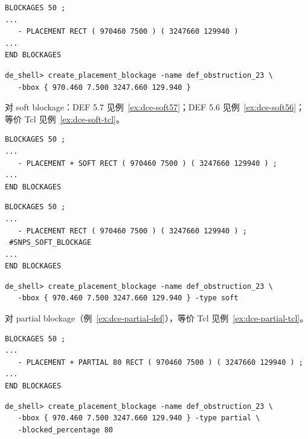 \begin{lstlisting}[caption={DEF hard placement blockage},label={ex:dce-hard-blk-def}]
BLOCKAGES 50 ;
...
   - PLACEMENT RECT ( 970460 7500 ) ( 3247660 129940 )
...
END BLOCKAGES
\end{lstlisting}

\begin{lstlisting}[caption={等价 Tcl},label={ex:dce-hard-blk-tcl}]
de_shell> create_placement_blockage -name def_obstruction_23 \
   -bbox { 970.460 7.500 3247.660 129.940 }
\end{lstlisting}

对 soft blockage：DEF 5.7 见例~\ref{ex:dce-soft57}；DEF 5.6 见例~\ref{ex:dce-soft56}；等价 Tcl 见例~\ref{ex:dce-soft-tcl}。

\begin{lstlisting}[caption={DEF 5.7 soft placement blockage},label={ex:dce-soft57}]
BLOCKAGES 50 ;
...
   - PLACEMENT + SOFT RECT ( 970460 7500 ) ( 3247660 129940 ) ;
...
END BLOCKAGES
\end{lstlisting}

\begin{lstlisting}[caption={DEF 5.6 soft placement blockage},label={ex:dce-soft56}]
BLOCKAGES 50 ;
...
   - PLACEMENT RECT ( 970460 7500 ) ( 3247660 129940 ) ;
 #SNPS_SOFT_BLOCKAGE
...
END BLOCKAGES
\end{lstlisting}

\begin{lstlisting}[caption={soft blockage 等价 Tcl},label={ex:dce-soft-tcl}]
de_shell> create_placement_blockage -name def_obstruction_23 \
   -bbox { 970.460 7.500 3247.660 129.940 } -type soft
\end{lstlisting}

对 partial blockage（例~\ref{ex:dce-partial-def}），等价 Tcl 见例~\ref{ex:dce-partial-tcl}。

\begin{lstlisting}[caption={DEF partial placement blockage},label={ex:dce-partial-def}]
BLOCKAGES 50 ;
...
   - PLACEMENT + PARTIAL 80 RECT ( 970460 7500 ) ( 3247660 129940 ) ;
...
END BLOCKAGES
\end{lstlisting}

\begin{lstlisting}[caption={partial blockage 等价 Tcl},label={ex:dce-partial-tcl}]
de_shell> create_placement_blockage -name def_obstruction_23 \
   -bbox { 970.460 7.500 3247.660 129.940 } -type partial \
   -blocked_percentage 80
\end{lstlisting}


